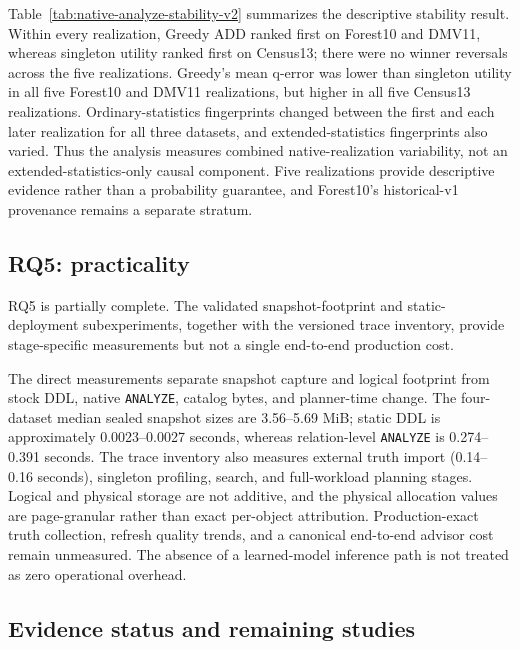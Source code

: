 

Table~\ref{tab:native-analyze-stability-v2} summarizes the descriptive
stability result. Within every realization, Greedy ADD ranked first on
Forest10 and DMV11, whereas singleton utility ranked first on Census13;
there were no winner reversals across the five realizations. Greedy's mean
q-error was lower than singleton utility in all five Forest10 and DMV11
realizations, but higher in all five Census13 realizations. Ordinary-statistics
fingerprints changed between the first and each later realization for all
three datasets, and extended-statistics fingerprints also varied. Thus the
analysis measures combined native-realization variability, not an
extended-statistics-only causal component. Five realizations provide
descriptive evidence rather than a probability guarantee, and Forest10's
historical-v1 provenance remains a separate stratum.

\subsection{RQ5: practicality}
RQ5 is partially complete. The validated snapshot-footprint and static-
deployment subexperiments, together with the versioned trace inventory,
provide stage-specific measurements but not a single end-to-end production
cost.



The direct measurements separate snapshot capture and logical footprint from
stock DDL, native \texttt{ANALYZE}, catalog bytes, and planner-time change.
The four-dataset median sealed snapshot sizes are 3.56--5.69 MiB;
static DDL is approximately 0.0023--0.0027 seconds, whereas relation-level
\texttt{ANALYZE} is 0.274--0.391 seconds. The trace inventory also measures
external truth import (0.14--0.16 seconds),
singleton profiling, search, and full-workload planning stages. Logical and
physical storage are not additive, and the physical allocation values are
page-granular rather than exact per-object attribution. Production-exact
truth collection, refresh quality trends, and a canonical end-to-end advisor
cost remain unmeasured. The absence of a learned-model inference path is not
treated as zero operational overhead.

\subsection{Evidence status and remaining studies}

